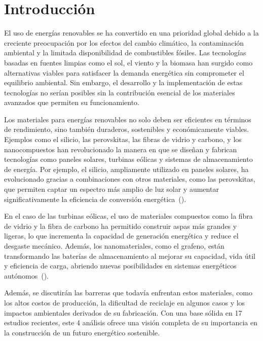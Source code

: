 \documentclass[letterpaper, 12pt]{article}
\begin{document}
\newpage

\tableofcontents
\newpage

\section{Introducción}

El uso de energías renovables se ha convertido en una prioridad global debido a
la creciente preocupación por los efectos del cambio climático, la
contaminación ambiental y la limitada disponibilidad de combustibles fósiles.
Las tecnologías basadas en fuentes limpias como el sol, el viento y la biomasa
han surgido como alternativas viables para satisfacer la demanda energética sin
comprometer el equilibrio ambiental. Sin embargo, el desarrollo y la
implementación de estas tecnologías no serían posibles sin la contribución
esencial de los materiales avanzados que permiten su funcionamiento.

Los materiales para energías renovables no solo deben ser eficientes en
términos de rendimiento, sino también duraderos, sostenibles y económicamente
viables. Ejemplos como el silicio, las perovskitas, las fibras de vidrio y
carbono, y los nanocompuestos han revolucionado la manera en que se diseñan y
fabrican tecnologías como paneles solares, turbinas eólicas y sistemas de
almacenamiento de energía. Por ejemplo, el silicio, ampliamente utilizado en
paneles solares, ha evolucionado gracias a combinaciones con otros materiales,
como las perovskitas, que permiten captar un espectro más amplio de luz solar y
aumentar significativamente la eficiencia de conversión
energética~(\cite{Henriksson2021}).

En el caso de las turbinas eólicas, el uso de materiales compuestos como la
fibra de vidrio y la fibra de carbono ha permitido construir aspas más grandes
y ligeras, lo que incrementa la capacidad de generación energética y reduce el
desgaste mecánico. Además, los nanomateriales, como el grafeno, están
transformando las baterías de almacenamiento al mejorar su capacidad, vida útil
y eficiencia de carga, abriendo nuevas posibilidades en sistemas energéticos
autónomos~(\cite{Galembeck2019}).

Además, se discutirán las barreras que todavía enfrentan estos materiales, como
los altos costos de producción, la dificultad de reciclaje en algunos casos y
los impactos ambientales derivados de su fabricación. Con una base sólida en 17
estudios recientes, este 4 análisis ofrece una visión completa de su
importancia en la construcción de un futuro energético sostenible.
\end{document}
